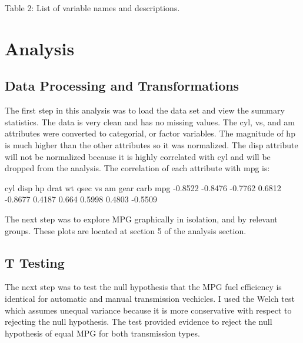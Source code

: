 \documentclass{article}
\begin{document}
{\begin{center}
\begin{minipage}{0.55\textwidth}
Table 2: List of variable names and descriptions.

\end{minipage}
\end{center}


\section*{Analysis}

\subsection{Data Processing and Transformations}


The first step in this analysis was to load the data set and view the summary statistics. The data is very clean and has no missing values. The cyl, vs, and am attributes were converted to categorial, or factor variables. The magnitude of hp is much higher than the other attributes so it was normalized. The disp attribute will not be normalized because it is highly correlated with cyl and will be dropped from the analysis. The correlation of each attribute with mpg is:

\begin{center}
\begin{minipage}{0.75\textwidth} 
\begin{Schunk}
\begin{Soutput}
        cyl    disp      hp   drat      wt   qsec    vs     am   gear    carb
mpg -0.8522 -0.8476 -0.7762 0.6812 -0.8677 0.4187 0.664 0.5998 0.4803 -0.5509
\end{Soutput}
\end{Schunk}
\end{minipage}
\end{center}


The next step was to explore MPG graphically in isolation, and by relevant groups. These plots are located at section 5 of the analysis section.


\subsection{T Testing}

The next step was to test the null hypothesis that the MPG fuel efficiency is identical for automatic and manual transmission vechicles. I used the Welch test which assumes unequal variance because it is more conservative with respect to rejecting the null hypothesis. The test provided evidence to reject the null hypothesis of equal MPG for both transmission types.

}
\end{document}
